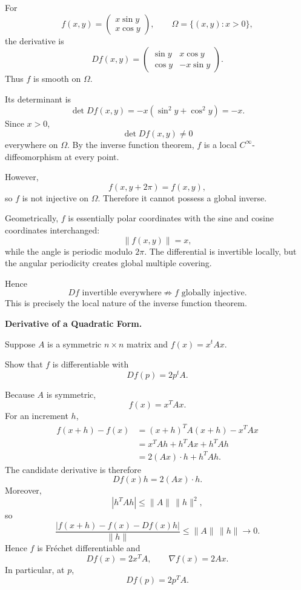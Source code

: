\begin{solution}
For
\[
f(x,y)
=
\begin{pmatrix}
x\sin y\\
x\cos y
\end{pmatrix},
\qquad
\Omega=\{(x,y):x>0\},
\]
the derivative is
\[
Df(x,y)
=
\begin{pmatrix}
\sin y&x\cos y\\
\cos y&-x\sin y
\end{pmatrix}.
\]
Thus \(f\) is smooth on \(\Omega\).

Its determinant is
\[
\det Df(x,y)
=
-x(\sin^2y+\cos^2y)
=
-x.
\]
Since \(x>0\),
\[
\det Df(x,y)\neq0
\]
everywhere on \(\Omega\). By the inverse function theorem, \(f\) is a local
\(C^\infty\)-diffeomorphism at every point.

However,
\[
f(x,y+2\pi)
=
f(x,y),
\]
so \(f\) is not injective on \(\Omega\). Therefore it cannot possess a global inverse.

Geometrically, \(f\) is essentially polar coordinates with the sine and cosine coordinates
interchanged:
\[
\|f(x,y)\|=x,
\]
while the angle is periodic modulo \(2\pi\). The differential is invertible locally, but the
angular periodicity creates global multiple covering.

Hence
\[
\boxed{
Df\text{ invertible everywhere}
\not\Longrightarrow
f\text{ globally injective}.
}
\]
This is precisely the local nature of the inverse function theorem.
\end{solution}


\begin{problem}[CP-II-0438]
\label{prob:cp-ii-0438}
\textbf{Derivative of a Quadratic Form.}

\hspace*{1.5em}Suppose $A$ is a symmetric $n\times n$ matrix and $f(x)=x^tAx$.

	Show that $f$ is differentiable with
	\[
	Df(p)=2p^tA.
	\]
\end{problem}

\begin{solution}
Because \(A\) is symmetric,
\[
f(x)=x^TAx.
\]
For an increment \(h\),
\[
\begin{aligned}
f(x+h)-f(x)
&=(x+h)^TA(x+h)-x^TAx\\
&=x^TAh+h^TAx+h^TAh\\
&=2(Ax)\cdot h+h^TAh.
\end{aligned}
\]
The candidate derivative is therefore
\[
Df(x)h=2(Ax)\cdot h.
\]
Moreover,
\[
|h^TAh|\le \|A\|\,\|h\|^2,
\]
so
\[
\frac{|f(x+h)-f(x)-Df(x)h|}{\|h\|}
\le \|A\|\,\|h\|\longrightarrow0.
\]
Hence \(f\) is Fréchet differentiable and
\[
\boxed{Df(x)=2x^TA,\qquad \nabla f(x)=2Ax.}
\]
In particular, at \(p\),
\[
Df(p)=2p^TA.
\]
\end{solution}

